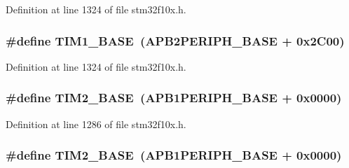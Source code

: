 Definition at line 1324 of file stm32f10x.\+h.

\subsubsection[{\texorpdfstring{T\+I\+M1\+\_\+\+B\+A\+SE}{TIM1_BASE}}]{\setlength{\rightskip}{0pt plus 5cm}\#define T\+I\+M1\+\_\+\+B\+A\+SE~({\bf A\+P\+B2\+P\+E\+R\+I\+P\+H\+\_\+\+B\+A\+SE} + 0x2\+C00)}\hypertarget{group___peripheral__memory__map_gaf8aa324ca5011b8173ab16585ed7324a}{}\label{group___peripheral__memory__map_gaf8aa324ca5011b8173ab16585ed7324a}


Definition at line 1324 of file stm32f10x.\+h.

\subsubsection[{\texorpdfstring{T\+I\+M2\+\_\+\+B\+A\+SE}{TIM2_BASE}}]{\setlength{\rightskip}{0pt plus 5cm}\#define T\+I\+M2\+\_\+\+B\+A\+SE~({\bf A\+P\+B1\+P\+E\+R\+I\+P\+H\+\_\+\+B\+A\+SE} + 0x0000)}\hypertarget{group___peripheral__memory__map_ga00d0fe6ad532ab32f0f81cafca8d3aa5}{}\label{group___peripheral__memory__map_ga00d0fe6ad532ab32f0f81cafca8d3aa5}


Definition at line 1286 of file stm32f10x.\+h.

\subsubsection[{\texorpdfstring{T\+I\+M2\+\_\+\+B\+A\+SE}{TIM2_BASE}}]{\setlength{\rightskip}{0pt plus 5cm}\#define T\+I\+M2\+\_\+\+B\+A\+SE~({\bf A\+P\+B1\+P\+E\+R\+I\+P\+H\+\_\+\+B\+A\+SE} + 0x0000)}\hypertarget{group___peripheral__memory__map_ga00d0fe6ad532ab32f0f81cafca8d3aa5}{}\label{group___peripheral__memory__map_ga00d0fe6ad532ab32f0f81cafca8d3aa5}


